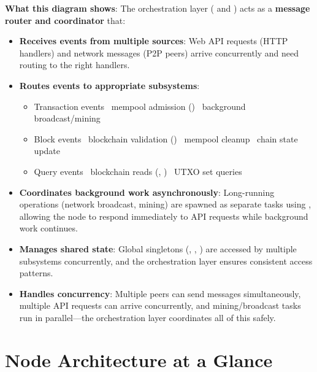\textbf{What this diagram shows}: The orchestration layer ( and ) acts as a \textbf{message router and coordinator} that:

\begin{itemize}
  \item \textbf{Receives events from multiple sources}: Web API requests (HTTP handlers) and network messages (P2P peers) arrive concurrently and need routing to the right handlers.

  \item \textbf{Routes events to appropriate subsystems}:
    \begin{itemize}
      \item Transaction events \textrightarrow\ mempool admission () \textrightarrow\ background broadcast/mining
      \item Block events \textrightarrow\ blockchain validation () \textrightarrow\ mempool cleanup \textrightarrow\ chain state update
      \item Query events \textrightarrow\ blockchain reads (, ) \textrightarrow\ UTXO set queries
    \end{itemize}

  \item \textbf{Coordinates background work asynchronously}: Long-running operations (network broadcast, mining) are spawned as separate tasks using , allowing the node to respond immediately to API requests while background work continues.

  \item \textbf{Manages shared state}: Global singletons (, , ) are accessed by multiple subsystems concurrently, and the orchestration layer ensures consistent access patterns.

  \item \textbf{Handles concurrency}: Multiple peers can send messages simultaneously, multiple API requests can arrive concurrently, and mining/broadcast tasks run in parallel---the orchestration layer coordinates all of this safely.
\end{itemize}

\section{Node Architecture at a Glance}
\label{sec:ch09-8-arch}

